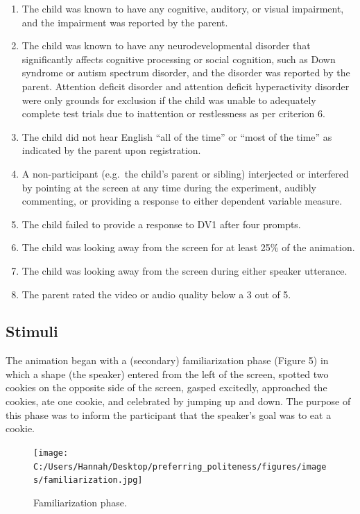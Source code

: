 \documentclass[
  english,
  man,floatsintext]{apa6}
\begin{document}
\begin{enumerate}
\def\labelenumi{\arabic{enumi}.}
\item
  The child was known to have any cognitive, auditory, or visual impairment, and the impairment was reported by the parent.
\item
  The child was known to have any neurodevelopmental disorder that significantly affects cognitive processing or social cognition, such as Down syndrome or autism spectrum disorder, and the disorder was reported by the parent. Attention deficit disorder and attention deficit hyperactivity disorder were only grounds for exclusion if the child was unable to adequately complete test trials due to inattention or restlessness as per criterion 6.
\item
  The child did not hear English ``all of the time'' or ``most of the time'' as indicated by the parent upon registration.
\item
  A non-participant (e.g.~the child's parent or sibling) interjected or interfered by pointing at the screen at any time during the experiment, audibly commenting, or providing a response to either dependent variable measure.
\item
  The child failed to provide a response to DV1 after four prompts.
\item
  The child was looking away from the screen for at least 25\% of the animation.
\item
  The child was looking away from the screen during either speaker utterance.
\item
  The parent rated the video or audio quality below a 3 out of 5.
\end{enumerate}

\hypertarget{stimuli}{%
\subsection{Stimuli}\label{stimuli}}

The animation began with a (secondary) familiarization phase (Figure 5) in which a shape (the speaker) entered from the left of the screen, spotted two cookies on the opposite side of the screen, gasped excitedly, approached the cookies, ate one cookie, and celebrated by jumping up and down. The purpose of this phase was to inform the participant that the speaker's goal was to eat a cookie.

\begin{figure}
\centering
\texttt{[image: C:/Users/Hannah/Desktop/preferring\_politeness/figures/images/familiarization.jpg]}
\caption{Familiarization phase.}
\end{figure}
\end{document}
